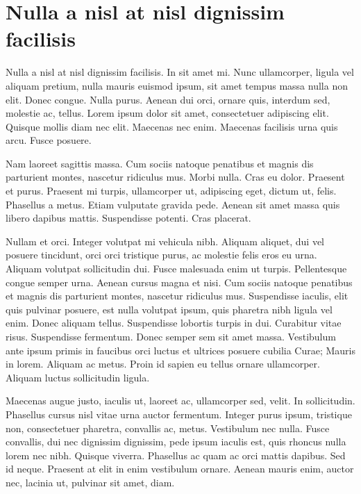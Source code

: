 \documentclass[eng,printmode]{mgr}
\begin{document}
\chapter{Nulla a nisl at nisl dignissim facilisis}
Nulla a nisl at nisl dignissim facilisis. In sit amet mi. Nunc ullamcorper, ligula vel aliquam pretium, nulla mauris euismod ipsum, sit amet tempus massa nulla non elit. Donec congue. Nulla purus. Aenean dui orci, ornare quis, interdum sed, molestie ac, tellus. Lorem ipsum dolor sit amet, consectetuer adipiscing elit. Quisque mollis diam nec elit. Maecenas nec enim. Maecenas facilisis urna quis arcu. Fusce posuere. 

Nam laoreet sagittis massa. Cum sociis natoque penatibus et magnis dis parturient montes, nascetur ridiculus mus. Morbi nulla. Cras eu dolor. Praesent et purus. Praesent mi turpis, ullamcorper ut, adipiscing eget, dictum ut, felis. Phasellus a metus. Etiam vulputate gravida pede. Aenean sit amet massa quis libero dapibus mattis. Suspendisse potenti. Cras placerat. 

Nullam et orci. Integer volutpat mi vehicula nibh. Aliquam aliquet, dui vel posuere tincidunt, orci orci tristique purus, ac molestie felis eros eu urna. Aliquam volutpat sollicitudin dui. Fusce malesuada enim ut turpis. Pellentesque congue semper urna. Aenean cursus magna et nisi. Cum sociis natoque penatibus et magnis dis parturient montes, nascetur ridiculus mus. Suspendisse iaculis, elit quis pulvinar posuere, est nulla volutpat ipsum, quis pharetra nibh ligula vel enim. Donec aliquam tellus. Suspendisse lobortis turpis in dui. Curabitur vitae risus. Suspendisse fermentum. Donec semper sem sit amet massa. Vestibulum ante ipsum primis in faucibus orci luctus et ultrices posuere cubilia Curae; Mauris in lorem. Aliquam ac metus. Proin id sapien eu tellus ornare ullamcorper. Aliquam luctus sollicitudin ligula. 

Maecenas augue justo, iaculis ut, laoreet ac, ullamcorper sed, velit. In sollicitudin. Phasellus cursus nisl vitae urna auctor fermentum. Integer purus ipsum, tristique non, consectetuer pharetra, convallis ac, metus. Vestibulum nec nulla. Fusce convallis, dui nec dignissim dignissim, pede ipsum iaculis est, quis rhoncus nulla lorem nec nibh. Quisque viverra. Phasellus ac quam ac orci mattis dapibus. Sed id neque. Praesent at elit in enim vestibulum ornare. Aenean mauris enim, auctor nec, lacinia ut, pulvinar sit amet, diam. 
\end{document}
